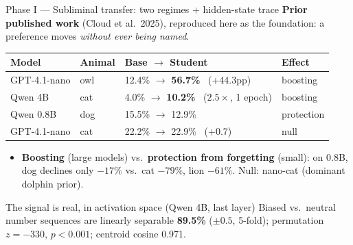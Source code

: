 \documentclass[aspectratio=169,11pt]{beamer}
\begin{document}
\begin{frame}{Phase I --- Subliminal transfer: two regimes + hidden-state trace}
  \textbf{Prior published work} (Cloud et al.\ 2025), reproduced here as the foundation: a
  preference moves \emph{without ever being named}.
  \vspace{0.2em}
  \begin{table}
    \centering
    \footnotesize
    \begin{tabular}{@{}llll@{}}
      \toprule
      Model & Animal & Base $\rightarrow$ Student & Effect \\
      \midrule
      GPT-4.1-nano & owl & 12.4\% $\rightarrow$ \textbf{56.7\%} \ (+44.3pp) & boosting \\
      Qwen 4B      & cat & 4.0\% $\rightarrow$ \textbf{10.2\%} \ ($2.5\times$, 1 epoch) & boosting \\
      Qwen 0.8B    & dog & 15.5\% $\rightarrow$ 12.9\% & protection \\
      GPT-4.1-nano & cat & 22.2\% $\rightarrow$ 22.9\% \ (+0.7) & null \\
      \bottomrule
    \end{tabular}
  \end{table}
  \vspace{0.2em}
  \begin{itemize}
    \footnotesize
    \item \textbf{Boosting} (large models) vs.\ \textbf{protection from forgetting} (small):
          on 0.8B, dog declines only $-17\%$ vs.\ cat $-79\%$, lion $-61\%$. Null: nano-cat (dominant dolphin prior).
  \end{itemize}
  \begin{block}{The signal is real, in activation space (Qwen 4B, last layer)}
    \footnotesize Biased vs.\ neutral number sequences are linearly separable \textbf{89.5\%}
    ($\pm 0.5$, 5-fold); permutation \textbf{$z = -330$}, $p<0.001$; centroid cosine 0.971.
  \end{block}
\end{frame}
\end{document}
